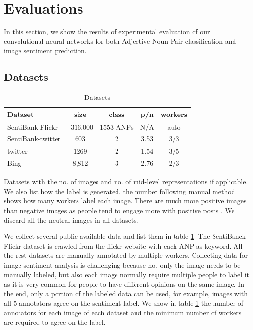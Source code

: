 \section{Evaluations}
\label{evaluation}

In this section, we show the results of experimental evaluation of our convolutional neural networks for both Adjective Noun Pair classification and image sentiment prediction.

\subsection{Datasets}
\label{eval_datasets}

\begin{table}
		\caption{Datasets}
		\label{table:datasets}
		\begin{threeparttable}
			\centering
			\begin{tabular}{l|cccc} \hline
				Dataset & size & class & p/n & workers \\ \hline
				SentiBank-Flickr \cite{borth2013large} & ~316,000 & 1553 ANPs & N/A & auto \\ 
				SentiBank-twitter \cite{borth2013large} & 603 & 2 & 3.53 & 3/3 \\
				twitter \cite{you2015robust} & 1269 & 2 & 1.54 & 3/5\\
				Bing \cite{ahsan2017towards} & 8,812 & 3 & 2.76 & 2/3 \\ \hline
			\end{tabular}
			\begin{tablenotes}
				\item Datasets with the no. of images and no. of mid-level representations if applicable. We also list how the label is generated, the number following manual method shows how many workers label each image. There are much more positive images than negative images as people tend to engage more with positive posts \cite{kramer2014experimental}. We discard all the neutral images in all datasets.
			\end{tablenotes}
		\end{threeparttable}
\end{table}

We collect several public available data and list them in table \ref{table:datasets}. The SentiBanck-Flickr dataset is crawled from the flickr website with each ANP as keyword. All the rest datasets are manually annotated by multiple workers. Collecting data for image sentiment analysis is challenging because not only the image needs to be manually labeled, but also each image normally require multiple people to label it as it is very common for people to have different opinions on the same image. In the end, only a portion of the labeled data can be used, for example, images with all 5 annotators agree on the sentiment label. We show in table \ref{table:datasets} the number of annotators for each image of each dataset and the minimum number of workers are required to agree on the label.

